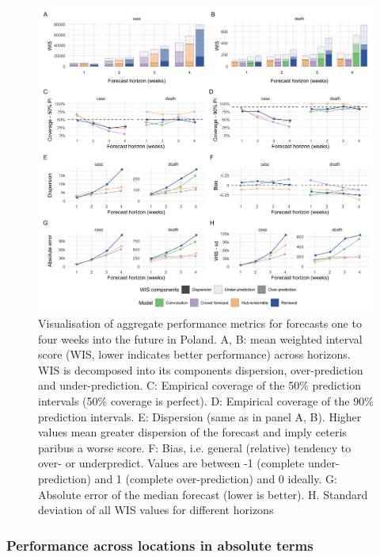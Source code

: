 \documentclass[10pt,letterpaper]{article}
\begin{document}
\begin{figure}[H]
\includegraphics[width=1\linewidth,]{../analysis/plots/aggregate-performance-all-Poland-v4} \caption{Visualisation of aggregate performance metrics for forecasts one to four weeks into the future in Poland. A, B: mean weighted interval score (WIS, lower indicates better performance) across horizons. WIS is decomposed into its components dispersion, over-prediction and under-prediction. C: Empirical coverage of the 50\% prediction intervals (50\% coverage is perfect). D: Empirical coverage of the 90\% prediction intervals. E: Dispersion (same as in panel A, B). Higher values mean greater dispersion of the forecast and imply ceteris paribus a worse score. F: Bias, i.e. general (relative) tendency to over- or underpredict. Values are between -1 (complete under-prediction) and 1 (complete over-prediction) and 0 ideally. G: Absolute error of the median forecast (lower is better). H. Standard deviation of all WIS values for different horizons}\label{fig:agg-performance-all-Poland}
\end{figure}

\hypertarget{performance-across-locations-in-absolute-terms}{%
\subsubsection{Performance across locations in absolute
terms}\label{performance-across-locations-in-absolute-terms}}
\end{document}
